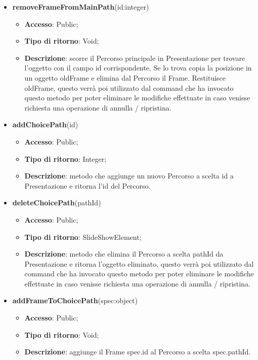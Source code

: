 {\begin{itemize}
\begin{itemize}
			\end{itemize}
			\item \textbf{removeFrameFromMainPath}(id:integer)
			\begin{itemize}
				\item \textbf{Accesso}: Public;
				\item \textbf{Tipo di ritorno}: Void;
				\item \textbf{Descrizione}: scorre il Percorso principale in Presentazione per trovare l’oggetto con il campo id corrispondente. Se lo trova copia la posizione in un oggetto oldFrame e elimina dal Percorso\ped{g} il Frame. Restituisce oldFrame, questo verrà poi utilizzato dal command che ha invocato questo metodo per poter eliminare le modifiche effettuate in caso venisse richiesta una operazione di annulla / ripristina.
			\end{itemize}
			\item \textbf{addChoicePath}(id)
			\begin{itemize}
				\item \textbf{Accesso}: Public;
				\item \textbf{Tipo di ritorno}: Integer;
				\item \textbf{Descrizione}: metodo che aggiunge un nuovo Percorso a scelta id a Presentazione e ritorna l'id del Percorso.
			\end{itemize}
			\item \textbf{deleteChoicePath}(pathId)
			\begin{itemize}
				\item \textbf{Accesso}: Public;
				\item \textbf{Tipo di ritorno}: SlideShowElement;
				\item \textbf{Descrizione}: metodo che elimina il Percorso a scelta pathId da Presentazione e ritorna l'oggetto eliminato, questo verrà poi utilizzato dal command che ha invocato questo metodo per poter eliminare le modifiche effettuate in caso venisse richiesta una operazione di annulla / ripristina.
			\end{itemize}
			\item \textbf{addFrameToChoicePath}(spec:object)
			\begin{itemize}
				\item \textbf{Accesso}: Public;
				\item \textbf{Tipo di ritorno}: Void;
				\item \textbf{Descrizione}: aggiunge il Frame spec.id al Percorso a scelta spec.pathId.

\end{itemize}
\end{itemize}}
